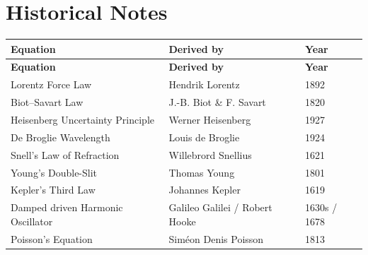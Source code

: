 \documentclass[11pt,openright]{book}
\begin{document}
\chapter{Historical Notes}
\begin{longtable}{p{6cm}p{6cm}p{2.5cm}}
\textbf{Equation} & \textbf{Derived by} & \textbf{Year} \\
\hline
\endfirsthead
\textbf{Equation} & \textbf{Derived by} & \textbf{Year} \\
\hline
\endhead
Lorentz Force Law & Hendrik Lorentz & 1892 \\
Biot--Savart Law & J.-B. Biot \& F. Savart & 1820 \\
Heisenberg Uncertainty Principle & Werner Heisenberg & 1927 \\
De Broglie Wavelength & Louis de Broglie & 1924 \\
Snell's Law of Refraction & Willebrord Snellius & 1621 \\
Young's Double-Slit & Thomas Young & 1801 \\
Kepler's Third Law & Johannes Kepler & 1619 \\
Damped driven Harmonic Oscillator & Galileo Galilei / Robert Hooke & 1630s / 1678 \\
Poisson's Equation & Sim\'{e}on Denis Poisson & 1813 \\


\end{longtable}
\end{document}
